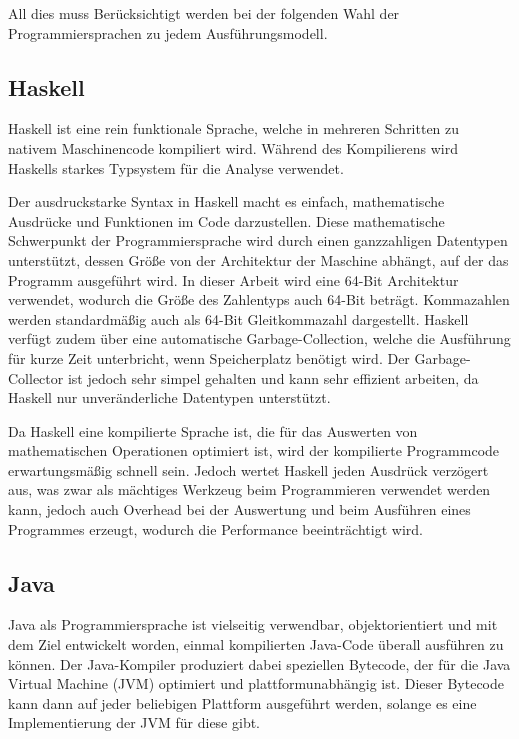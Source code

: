 \documentclass[11pt, parskip=half]{scrartcl}       %
\begin{document}
All dies muss Berücksichtigt werden bei der folgenden Wahl der Programmiersprachen zu jedem Ausführungsmodell. 

\subsection{Haskell}

Haskell ist eine rein funktionale Sprache, welche in mehreren Schritten zu nativem Maschinencode kompiliert wird.
Während des Kompilierens wird Haskells starkes Typsystem für die Analyse verwendet.

Der ausdruckstarke Syntax in Haskell macht es einfach, mathematische Ausdrücke und Funktionen im Code darzustellen.
Diese mathematische Schwerpunkt der Programmiersprache wird durch einen ganzzahligen Datentypen unterstützt, dessen Größe von der Architektur der Maschine abhängt, auf der das Programm ausgeführt wird.
In dieser Arbeit wird eine 64-Bit Architektur verwendet, wodurch die Größe des Zahlentyps auch 64-Bit beträgt.
Kommazahlen werden standardmäßig auch als 64-Bit Gleitkommazahl dargestellt.
Haskell verfügt zudem über eine automatische Garbage-Collection, welche die Ausführung für kurze Zeit unterbricht, wenn Speicherplatz benötigt wird.
Der Garbage-Collector ist jedoch sehr simpel gehalten und kann sehr effizient arbeiten, da Haskell nur unveränderliche Datentypen unterstützt.


Da Haskell eine kompilierte Sprache ist, die für das Auswerten von mathematischen Operationen optimiert ist, wird der kompilierte Programmcode erwartungsmäßig schnell sein.
Jedoch wertet Haskell jeden Ausdrück verzögert aus, was zwar als mächtiges Werkzeug beim Programmieren verwendet werden kann, jedoch auch Overhead bei der Auswertung und beim Ausführen eines Programmes erzeugt, wodurch die Performance beeinträchtigt wird.


\subsection{Java}

Java als Programmiersprache ist vielseitig verwendbar, objektorientiert und mit dem Ziel entwickelt worden, einmal kompilierten Java-Code überall ausführen zu können.
Der Java-Kompiler produziert dabei speziellen Bytecode, der für die Java Virtual Machine (JVM) optimiert und plattformunabhängig ist.
Dieser Bytecode kann dann auf jeder beliebigen Plattform ausgeführt werden, solange es eine Implementierung der JVM für diese gibt.
\end{document}
